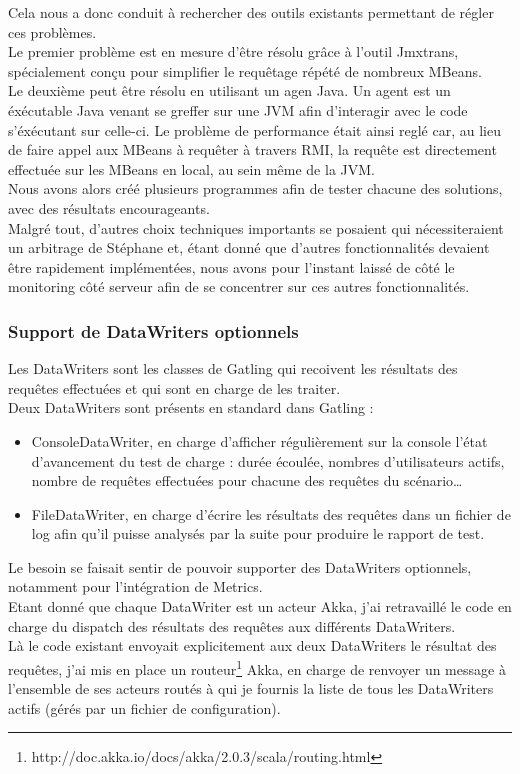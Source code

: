 Cela nous a donc conduit à rechercher des outils existants permettant de régler ces problèmes.\\
Le premier problème est en mesure d'être résolu grâce à l'outil Jmxtrans, spécialement conçu pour simplifier le requêtage répété de nombreux MBeans.\\
Le deuxième peut \^etre résolu en utilisant un agen Java. Un agent est un éxécutable Java venant se greffer sur une JVM afin d'interagir avec le code s'éxécutant sur celle-ci. Le problème de performance était ainsi reglé car, au lieu de faire appel aux MBeans à requ\^eter à travers RMI, la requ\^ete est directement effectuée sur les MBeans en local, au sein même de la JVM.\\

Nous avons alors créé plusieurs programmes afin de tester chacune des solutions, avec des résultats encourageants.\\
Malgré tout, d'autres choix techniques importants se posaient qui nécessiteraient un arbitrage de Stéphane et, étant donné que d'autres fonctionnalités devaient \^etre rapidement implémentées, nous avons pour l'instant laissé de c\^oté le monitoring c\^oté serveur afin de se concentrer sur ces autres fonctionnalités.

\subsubsection{Support de DataWriters optionnels}

Les DataWriters sont les classes de Gatling qui recoivent les résultats des requêtes effectuées et qui sont en charge de les traiter.\\
Deux DataWriters sont présents en standard dans Gatling : 
\begin{itemize}
	\item ConsoleDataWriter, en charge d'afficher régulièrement sur la console l'état d'avancement du test de charge : durée écoulée, nombres d'utilisateurs actifs, nombre de requêtes effectuées pour chacune des requêtes du scénario\ldots
	\item FileDataWriter, en charge d'écrire les résultats des requêtes dans un fichier de log afin qu'il puisse analysés par la suite pour produire le rapport de test.\\
\end{itemize}

Le besoin se faisait sentir de pouvoir supporter des DataWriters optionnels, notamment pour l'intégration de Metrics.\\
Etant donné que chaque DataWriter est un acteur Akka, j'ai retravaillé le code en charge du dispatch des résultats des requêtes aux différents DataWriters.\\
Là le code existant envoyait explicitement aux deux DataWriters le résultat des requêtes, j'ai mis en place un routeur\footnote{http://doc.akka.io/docs/akka/2.0.3/scala/routing.html} Akka,  en charge de renvoyer un message à l'ensemble de ses acteurs routés à qui je fournis la liste de tous les DataWriters actifs (gérés par un fichier de configuration). 
